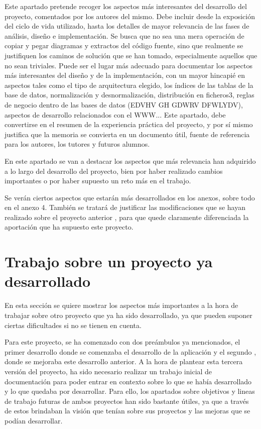 
Este apartado pretende recoger los aspectos más interesantes del desarrollo del proyecto, comentados por los autores del mismo.
Debe incluir desde la exposición del ciclo de vida utilizado, hasta los detalles de mayor relevancia de las fases de análisis, diseño e implementación.
Se busca que no sea una mera operación de copiar y pegar diagramas y extractos del código fuente, sino que realmente se justifiquen los caminos de solución que se han tomado, especialmente aquellos que no sean triviales.
Puede ser el lugar más adecuado para documentar los aspectos más interesantes del diseño y de la implementación, con un mayor hincapié en aspectos tales como el tipo de arquitectura elegido, los índices de las tablas de la base de datos, normalización y desnormalización, distribución en ficheros3, reglas de negocio dentro de las bases de datos (EDVHV GH GDWRV DFWLYDV), aspectos de desarrollo relacionados con el WWW...
Este apartado, debe convertirse en el resumen de la experiencia práctica del proyecto, y por sí mismo justifica que la memoria se convierta en un documento útil, fuente de referencia para los autores, los tutores y futuros alumnos.

En este apartado se van a destacar los aspectos que más relevancia han adquirido a lo largo del desarrollo del proyecto, bien por haber realizado cambios importantes o por haber supuesto un reto más en el trabajo.

Se verán ciertos aspectos que estarán más desarrollados en los anexos, sobre todo en el anexo 4. También se tratará de justificar las modificaciones que se hayan realizado sobre el proyecto anterior \cite{tfm1}, para que quede claramente diferenciada la aportación que ha supuesto este proyecto.

\section{Trabajo sobre un proyecto ya desarrollado}

En esta sección se quiere mostrar los aspectos más importantes a la hora de trabajar sobre otro proyecto que ya ha sido desarrollado, ya que pueden suponer ciertas dificultades si no se tienen en cuenta.

Para este proyecto, se ha comenzado con dos preámbulos ya mencionados, el primer desarrollo \cite{tfg1} donde se comenzaba el desarrollo de la aplicación y el segundo \cite{tfm1}, donde se mejoraba este desarrollo anterior. A la hora de plantear esta tercera versión del proyecto, ha sido necesario realizar un trabajo inicial de documentación para poder entrar en contexto sobre lo que se había desarrollado y lo que quedaba por desarrollar. Para ello, los apartados sobre objetivos y lineas de trabajo futuras de ambos proyectos han sido bastante útiles, ya que a través de estos brindaban la visión que tenían sobre sus proyectos y las mejoras que se podían desarrollar.

